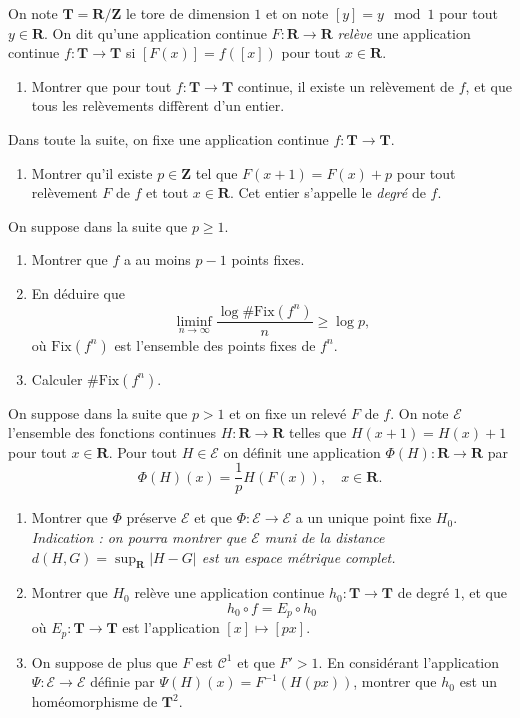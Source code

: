 \documentclass[a4paper,10pt,openany]{article}
\theoremstyle{plain}
\theoremstyle{definition}
\newcommand{\T}{\mathbf{T}}
\newcommand{\R}{\mathbf{R}}
\newcommand{\Z}{\mathbf{Z}}
\begin{document}
\noindent On note $\T = \R / \Z$ le tore de dimension $1$ et on note $[y] = y \mod 1$ pour tout $y \in \R$. On dit qu'une application continue $F : \R \to \R$ \textit{rel\`eve} une application continue $f : \T \to \T$ si $\left[F(x)\right] = f\left([x]\right)$ pour tout $x \in \R$.
\begin{enumerate}
\item Montrer que pour tout $f : \T \to \T$ continue, il existe un rel\`evement de $f$, et que tous les rel\`evements diff\`erent d'un entier.
\end{enumerate}
Dans toute la suite, on fixe une application continue $f : \T \to \T$.
\begin{enumerate}[resume]
\item Montrer qu'il existe $p \in \Z$ tel que $F(x+1) = F(x) + p$ pour tout rel\`evement $F$ de $f$ et tout $x \in \R$. Cet entier s'appelle le \textit{degr\'e} de $f$.
\end{enumerate}
On suppose dans la suite que $p \geq 1$.
\begin{enumerate}[resume]
\item Montrer que $f$ a au moins $p-1$ points fixes.
\item En d\'eduire que 
$$
\liminf_{n \to \infty} \frac{\log \# \mathrm{Fix}(f^n)}{n} \geq \log p,
$$
o\`u $\mathrm{Fix}(f^n)$ est l'ensemble des points fixes de $f^n$.
\item Calculer $\# \mathrm{Fix}(f^n).$
\end{enumerate}
On suppose dans la suite que $p>1$ et on fixe un relev\'e $F$ de $f$. On note $\mathcal{E}$ l'ensemble des fonctions continues $H: \R \to \R$ telles que $H(x+1) = H(x)+1$ pour tout $x \in \R$. Pour tout $H \in \mathcal{E}$ on d\'efinit une application $\Phi(H) : \R \to \R$ par
$$
\Phi(H)(x) = \frac{1}{p}H(F(x)), \quad x \in \R.
$$
\begin{enumerate}[resume]
\item Montrer que $\Phi$ pr\'eserve $\mathcal{E}$ et que $\Phi : \mathcal{E} \to \mathcal{E}$ a un unique point fixe $H_0$. \\
\textit{Indication : on pourra montrer que $\mathcal{E}$ muni de la distance $d(H,G) = \sup_{\R} |H-G|$ est un espace m\'etrique complet.}
\item Montrer que $H_0$ rel\`eve une application continue $h_0 : \T  \to \T$ de degr\'e $1$, et que 
$$
h_0 \circ f = E_p \circ h_0
$$
o\`u $E_p : \T \to \T$ est l'application $[x] \mapsto [px]$.
\item On suppose de plus que $F$ est $\mathcal{C}^1$ et que $F'>1$. En consid\'erant l'application $\Psi : \mathcal{E} \to \mathcal{E} $ d\'efinie par $\Psi(H)(x) = F^{-1}(H(px))$, montrer que $h_0$ est un hom\'eomorphisme de $\T^2$.



\end{enumerate}
\end{document}
